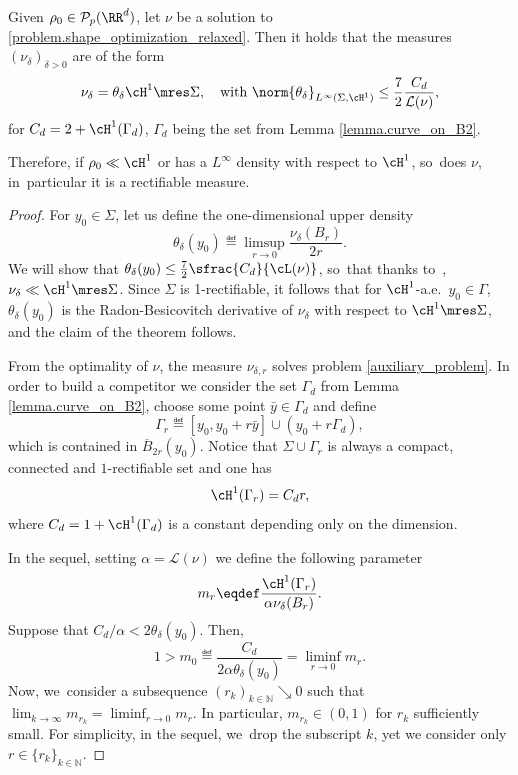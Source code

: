 \begin{theorem}\label{theorem.solutions_are_absolutely_continuous}
Given $\rho_0 \in \mathcal{P}_p(\RR^d)$, let $\nu$ be a solution to \eqref{problem.shape_optimization_relaxed}.
Then it holds that the measures $\left(\nu_\delta\right)_{\delta > 0}$ are of the form
\[
\nu_\delta = \theta_\delta \cH^1\mres \Sigma,
\quad\text{with $
\norm{\theta_\delta}_{L^\infty(\Sigma, \cH^1)}
\le
\frac{7}{2}\frac{C_d}{\mathcal{L}(\nu)}$,}
\]
for $C_d = 2 + \cH^1(\Gamma_d)$, $\Gamma_d$ being the set from Lemma \ref{lemma.curve_on_B2}.

Therefore,
if $\rho_0 \ll \cH^1$ or has a $L^{\infty}$ density with respect to $\cH^1$, so~does $\nu$, in~particular it is a rectifiable measure.
\end{theorem}

\begin{proof}
For $y_0 \in \Sigma$, let us define the one-dimensional upper density~\cite[Def.\,2.55]{ambrosio2000functions}
\begin{equation*}
\theta_\delta(y_0)\eqdef\limsup_{r \to 0} \frac{\nu_{\delta}(B_r)}{2r}.
\end{equation*}
We will show that $\theta_{\delta}(y_0)\leq \frac{7}{2}\sfrac{C_d}{\cL(\nu)}$, so~that thanks to~\cite[Th.\,2.56]{ambrosio2000functions}, $\nu_\delta \ll \cH^1\mres\Sigma$.
Since $\Sigma$ is 1-rectifiable, it follows that for $\cH^1$-a.e.~$y_0 \in \Gamma$, $\theta_\delta(y_0)$ is the Radon-Besicovitch
derivative of $\nu_\delta$ with respect to $\cH^1\mres\Sigma$, and the claim of the theorem follows.

From the optimality of $\nu$, the measure $\nu_{\delta,r}$ solves problem \eqref{auxiliary_problem}. In order to build a competitor we consider the set $\Gamma_d$ from Lemma \ref{lemma.curve_on_B2}, choose some point $\bar y \in \Gamma_d$ and define
\[
\Gamma_r
\eqdef
[y_0, y_0 + r\bar y]\cup
(y_0 + r\Gamma_d),
\]
which is contained in $\overline{B}_{2r}(y_0)$. Notice that $\Sigma \cup \Gamma_{r}$ is always a compact, connected and $1$-rectifiable set and one has
\[
\cH^1(\Gamma_{r})
=
C_dr,
\]
where $C_d = 1 + \cH^1(\Gamma_d)$ is a constant depending only on the dimension.

In the sequel, setting $\alpha = \mathcal{L}(\nu)$ we define the following parameter
\[
m_{r} \eqdef
\frac{\cH^1(\Gamma_r)}{\alpha \nu_\delta(B_r)}.\]
Suppose that $C_d/\alpha < 2\theta_{\delta}(y_0)$. Then,
\begin{equation*}
1> m_0\eqdef\frac{C_d}{2\alpha\theta_\delta(y_0)}= \liminf_{r \to 0} m_r.
\end{equation*}
Now, we~consider a subsequence $(r_{k})_{k\in \mathbb{N}}\searrow 0$ such that $\lim_{k \to \infty} m_{r_k}=\liminf_{r \to 0} m_r$. In particular, $m_{r_k} \in (0,1)$ for $r_k$ sufficiently small.
For simplicity, in the sequel, we~drop the subscript $k$, yet we consider only $r \in \{r_{k}\}_{k\in \mathbb{N}}$.


\end{proof}
